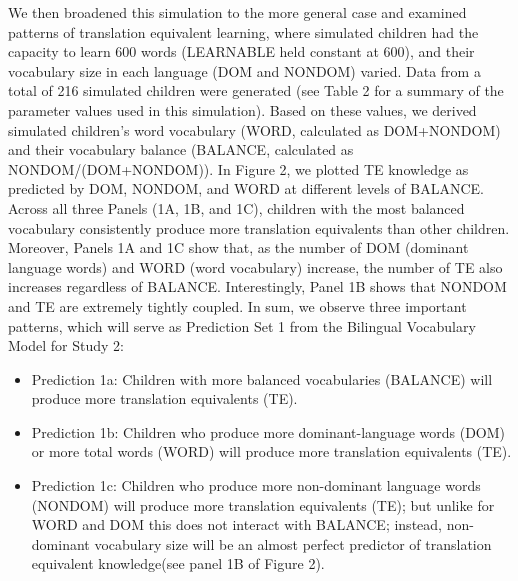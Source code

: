 \documentclass[
  english,
  ,man,floatsintext]{apa6}
\providecommand{\tightlist}{%
  \setlength{\itemsep}{0pt}\setlength{\parskip}{0pt}}
\begin{document}
We then broadened this simulation to the more general case and examined patterns of translation equivalent learning, where simulated children had the capacity to learn 600 words (LEARNABLE held constant at 600), and their vocabulary size in each language (DOM and NONDOM) varied. Data from a total of 216 simulated children were generated (see Table 2 for a summary of the parameter values used in this simulation). Based on these values, we derived simulated children's word vocabulary (WORD, calculated as DOM+NONDOM) and their vocabulary balance (BALANCE, calculated as NONDOM/(DOM+NONDOM)). In Figure 2, we plotted TE knowledge as predicted by DOM, NONDOM, and WORD at different levels of BALANCE. Across all three Panels (1A, 1B, and 1C), children with the most balanced vocabulary consistently produce more translation equivalents than other children. Moreover, Panels 1A and 1C show that, as the number of DOM (dominant language words) and WORD (word vocabulary) increase, the number of TE also increases regardless of BALANCE. Interestingly, Panel 1B shows that NONDOM and TE are extremely tightly coupled. In sum, we observe three important patterns, which will serve as Prediction Set 1 from the Bilingual Vocabulary Model for Study 2:

\begin{itemize}
\tightlist
\item
  Prediction 1a: Children with more balanced vocabularies (BALANCE) will produce more translation equivalents (TE).
\item
  Prediction 1b: Children who produce more dominant-language words (DOM) or more total words (WORD) will produce more translation equivalents (TE).
\item
  Prediction 1c: Children who produce more non-dominant language words (NONDOM) will produce more translation equivalents (TE); but unlike for WORD and DOM this does not interact with BALANCE; instead, non-dominant vocabulary size will be an almost perfect predictor of translation equivalent knowledge(see panel 1B of Figure 2).
\end{itemize}
\end{document}
